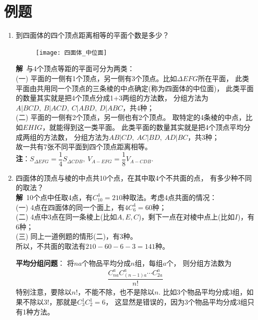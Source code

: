 \section{例题}
\begin{enumerate}[label={【\textbf{例\thechapter.\arabic*}】},
 leftmargin=\inteval{\myenumleftmargin}pt,
 itemsep=\inteval{\myenumitempsep}pt,
 itemindent=\inteval{\myenumitemindent}pt]
 
\item 到四面体的四个顶点距离相等的平面个数是多少？ 
\begin{figure}[H]
    \centering
    \texttt{[image: 四面体\_中位面]}
\end{figure}
\textbf{解}\ 与4个顶点等距的平面可分为两类：\\
(一) 平面的一侧有1个顶点，另一侧有3个顶点。比如$ \Delta EFG $所在平面，
此类平面由共用同一个顶点的三条棱的中点确定(称为四面体的中位面)，
此类平面的数量其实就是把4个顶点分成1+3两组的方法数，
分组方法为$ A|BCD,\ B|ACD,\ C|ABD,\ D|ABC $，共4种；\\
(二) 平面的一侧有2个顶点，另一侧也有2个顶点。
取特定的4条棱的中点，比如$ EHIG $，就能得到这一类平面。
此类平面的数量其实就是把4个顶点平均分成两组的方法数，
分组方法为$ AB|CD,\ AC|BD,\ AD|BC $，共3种；\\
故一共有7张不同平面到四个顶点距离相等。\\
\textbf{注}：$ S_{\Delta EFG}=\dfrac{1}{4}S_{\Delta CDB},\ 
V_{A-EFG}=\dfrac{1}{8}V_{A-CDB} $. 

\item 四面体的顶点与棱的中点共10个点，在其中取4个不共面的点，
有多少种不同的取法？\\
\textbf{解}\ 10个点中任取4点，有$ C_{10}^4=210 $种取法。考虑4点共面的情况：\\
(一) 4点在四面体的同一个面上，有$ 4C_6^4=60 $种；\\
(二) 4点中3点在同一条棱上(比如$ A,E,C $)，剩下一点在对棱中点上(比如$ I $)，有6种；\\
(三) 同上一道例题的情形(二)，有3种。\\
所以，不共面的取法有$ 210-60-6-3=141 $种。
\bigskip

\textbf{平均分组问题}： 将$na$个物品平均分成$n$组，每组$a$个，
则分组方法数为
\begin{gather}\label{平均分组方法数}
    \dfrac{C_{na}^aC_{(n-1)a}^a\cdots C_{2a}^a}{n!}
\end{gather}
特别注意，要除以$n!$，不能不除，也不是除以$n$. 
比如3个物品平均分成3组，如果不除以$3!$，那就是$C_3^1C_2^1=6$，
这显然是错误的，因为3个物品平均分成3组只有1种方法。


\end{enumerate}
